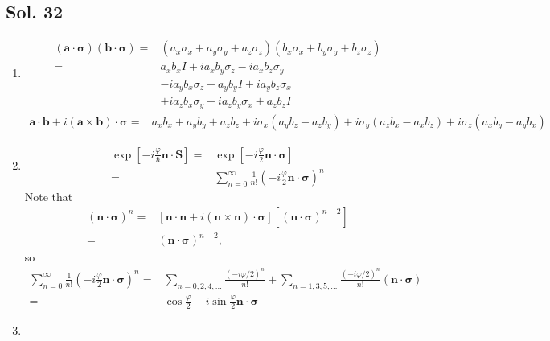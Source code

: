 \subsection*{Sol. 32}

\begin{enumerate}
    \item 
    \begin{align*}
        (\bm a\cdot \bm \sigma)(\bm b\cdot \bm\sigma)
        =&
        (a_x\sigma_x+a_y\sigma_y+a_z\sigma_z)
        (b_x\sigma_x+b_y\sigma_y+b_z\sigma_z)\\
        =&a_xb_xI + ia_xb_y\sigma_z - ia_xb_z\sigma_y\\
        &-ia_yb_x\sigma_z + a_yb_yI + ia_yb_z\sigma_x \\
        & +ia_zb_x\sigma_y - ia_zb_y\sigma_x + a_zb_zI
    \end{align*}
    \begin{align*}
        \bm a\cdot \bm b + i(\bm a\times \bm b)\cdot \bm \sigma 
        =& a_xb_x + a_yb_y + a_zb_z + 
        i\sigma_x(a_yb_z-a_zb_y)
        +i\sigma_y(a_zb_x-a_xb_z) +
        i\sigma_z(a_xb_y-a_yb_x)
    \end{align*}
    \item 
    \begin{align*}
        \exp\left[-i\frac{\varphi}{\hbar}\bm n\cdot\bm S\right]
        =&\exp\left[-i\frac{\varphi}{2}\bm n\cdot\bm \sigma\right]\\
        =&\sum_{n=0}^\infty
        \frac{1}{n!}\left(-i\frac{\varphi}{2}\bm n\cdot\bm\sigma\right)^n
    \end{align*}
    Note that
    \begin{align*}
        \left(\bm n\cdot\bm\sigma\right)^n = &
        \left[
        \bm n\cdot\bm n + i(\bm n\times \bm n)\cdot \bm \sigma
        \right]\left[\left(\bm n\cdot\bm\sigma\right)^{n-2}\right]\\
        =&\left(\bm n\cdot\bm\sigma\right)^{n-2},
    \end{align*}
    so 
    \begin{align*}
        \sum_{n=0}^\infty
        \frac{1}{n!}\left(-i\frac{\varphi}{2}\bm n\cdot\bm\sigma\right)^n
        =& 
        \sum_{n=0,2,4,\dots}\frac{(-i\varphi/2)^n}{n!}
        +
        \sum_{n=1,3,5,\dots}\frac{(-i\varphi/2)^n}{n!}(\bm n\cdot\bm\sigma)\\
        =&
        \cos\frac{\varphi}{2} - i 
        \sin\frac{\varphi}{2}\bm n\cdot\bm\sigma
    \end{align*}
    \item

\end{enumerate}

